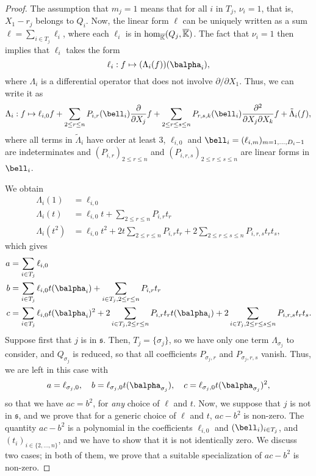 \documentclass[12pt]{article}
\def\Kbar {{\ensuremath{\overline{\mathbb{K}}}}}
\begin{document}
\begin{proof}
  The assumption that $m_j=1$ means that for all $i$ in $T_j$,
  $\nu_i=1$, that is, $X_1-r_j$ belongs to $Q_i$. Now, the linear 
  form $\ell$ can be uniquely written as a sum $\ell=\sum_{i \in T_j}
  \ell_i$, where each $\ell_i$ is in ${\rm hom}_\Kbar(Q_j,\Kbar)$.
  The fact that $\nu_i=1$ then implies that $\ell_i$ takes the form 
$$\ell_i: f \mapsto (\Lambda_{i}(f))(\balpha_i),$$
where $\Lambda_{i}$ is a differential operator that does not 
involve $\partial/\partial X_1$. Thus, we can write it as
$$\Lambda_i: f \mapsto \ell_{i,0} f + \sum_{2 \le r \le n}
P_{i,r}(\bell_i) \frac{\partial}{\partial X_j} f + \sum_{2 \le r \le s
  \le n} P_{r,s,k}(\bell_i) \frac{\partial^2}{\partial X_j\partial
  X_k} f + \tilde\Lambda_i(f),$$ where all terms in $\tilde \Lambda_i$
have order at least $3$, $\ell_{i,0}$ and $\bell_i=(\ell_{i,m})_{m
  =1,\dots,D_i-1}$ are indeterminates and
$(P_{i,r})_{2 \le r \le n}$ and $(P_{i,r,s})_{2 \le r \le s \le n}$
are linear forms in $\bell_i$.

We obtain
\begin{align*}
\Lambda_i(1)   &= \ell_{i,0} \\
\Lambda_i(t)   &= \ell_{i,0} t +\sum_{2 \le r \le n}P_{i,r}t_r \\
\Lambda_i(t^2) &= \ell_{i,0} t^2  +2 t \sum_{2 \le r \le n}P_{i,r}t_r   
                                                + 2\sum_{2 \le r \le s \le n} P_{i,r,s}t_rt_s,
\end{align*}
which gives
\begin{align*}
a  &= \sum_{i\in T_j}\ell_{i,0} \\
b  &= \sum_{i\in T_j}\ell_{i,0} t(\balpha_i) +\sum_{i \in T_j, 2 \le r \le n}P_{i,r}t_r \\
c &= \sum_{i\in T_j}\ell_{i,0} t(\balpha_i)^2  +2  \sum_{i \in T_j, 2 \le r \le n}P_{i,r}t_r t(\balpha_i)   
                                                +2 \sum_{i \in T_j, 2 \le r \le s \le n} P_{i,r,s}t_rt_s.
\end{align*}
Suppose first that $j$ is in $\mathfrak{s}$. Then, $T_j=\{\sigma_j\}$, so we 
have only one term $\Lambda_{\sigma_j}$ to consider, and $Q_{\sigma_j}$ 
is reduced, so that all coefficients $P_{\sigma_j,r}$ and
$P_{\sigma_j,r,s}$ vanish. Thus, we are left in
this case with
$$
a = \ell_{\sigma_j,0}, \quad
b = \ell_{\sigma_j,0} t(\balpha_{\sigma_j}), \quad
c = \ell_{\sigma_j,0} t(\balpha_{\sigma_j})^2,
$$ so that we have $ac=b^2$, for {\em any} choice of $\ell$ and
$t$. Now, we suppose that $j$ is not in $\mathfrak{s}$, and we prove
that for a generic choice of $\ell$ and $t$, $ac-b^2$ is non-zero.
The quantity $ac-b^2$ is a polynomial in the coefficients $\ell_{i,0}$
and $(\bell_i)_{i\in T_j}$, and $(t_i)_{i \in \{2,\dots,n\}}$,
and we have to show that it is not identically zero. We discuss
two cases; in both of them, we prove that a suitable specialization
of $ac-b^2$ is non-zero.


\end{proof}
\end{document}
